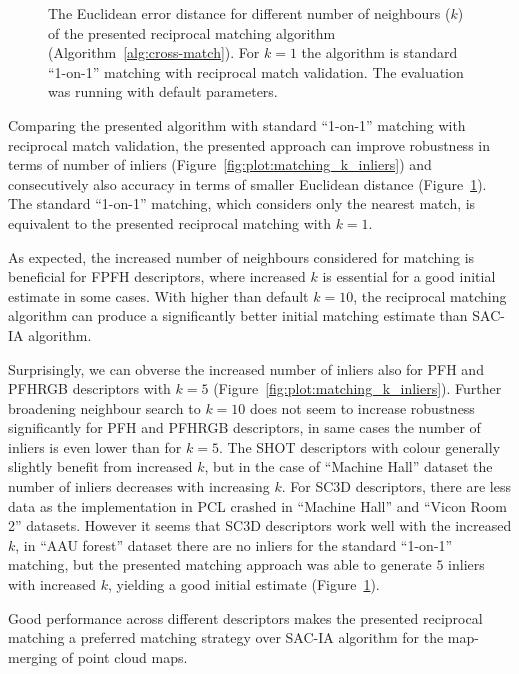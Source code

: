 \begin{figure}
  \centering
  
  \caption[The Euclidean distance per $k$ in the reciprocal matching algorithm]{The Euclidean error distance for different number of neighbours ($k$) of the presented reciprocal matching algorithm (Algorithm~\ref{alg:cross-match}). For $k=1$ the algorithm is standard ``1-on-1'' matching with reciprocal match validation. The evaluation was running with default parameters.}
  \label{fig:plot:matching_k_dist}
\end{figure}

Comparing the presented algorithm with standard ``1-on-1'' matching with reciprocal match validation, the presented approach can improve robustness in terms of number of inliers (Figure~\ref{fig:plot:matching_k_inliers}) and consecutively also accuracy in terms of smaller Euclidean distance (Figure~\ref{fig:plot:matching_k_dist}). The standard ``1-on-1'' matching, which considers only the nearest match, is equivalent to the presented reciprocal matching with $k=1$.

As expected, the increased number of neighbours considered for matching is beneficial for \gls{FPFH} descriptors, where increased $k$ is essential for a good initial estimate in some cases. With higher than default $k=10$, the reciprocal matching algorithm can produce a significantly better initial matching estimate than \gls{SAC-IA} algorithm.

Surprisingly, we can obverse the increased number of inliers also for \gls{PFH} and \gls{PFHRGB} descriptors with $k=5$ (Figure~\ref{fig:plot:matching_k_inliers}). Further broadening neighbour search to $k=10$ does not seem to increase robustness significantly for \gls{PFH} and \gls{PFHRGB} descriptors, in same cases the number of inliers is even lower than for $k=5$. The \gls{SHOT} descriptors with colour generally slightly benefit from increased $k$, but in the case of ``Machine Hall'' dataset the number of inliers decreases with increasing $k$. For \gls{SC3D} descriptors, there are less data as the implementation in \gls{PCL} crashed in ``Machine Hall'' and ``Vicon Room 2'' datasets. However it seems that \gls{SC3D} descriptors work well with the increased $k$, in ``AAU forest'' dataset there are no inliers for the standard ``1-on-1'' matching, but the presented matching approach was able to generate $5$ inliers with increased $k$, yielding a good initial estimate (Figure~\ref{fig:plot:matching_k_dist}).

Good performance across different descriptors makes the presented reciprocal matching a preferred matching strategy over \gls{SAC-IA} algorithm for the map-merging of point cloud maps.
